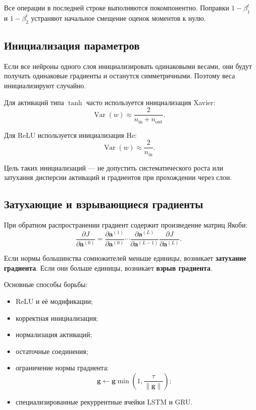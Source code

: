 \documentclass[12pt,a4paper]{article}
\theoremstyle{definition}
\newcommand{\1}{\mathbf{1}}
\begin{document}
Все операции в последней строке выполняются покомпонентно.
Поправки $1-\beta_1^t$ и $1-\beta_2^t$ устраняют начальное смещение
оценок моментов к нулю.

\subsection{Инициализация параметров}

Если все нейроны одного слоя инициализировать одинаковыми весами,
они будут получать одинаковые градиенты и останутся симметричными.
Поэтому веса инициализируют случайно.

Для активаций типа $\tanh$ часто используется инициализация Xavier:
\[
    \operatorname{Var}(w)
    \approx
    \frac{2}{n_{\mathrm{in}}+n_{\mathrm{out}}}.
\]

Для ReLU используется инициализация He:
\[
    \operatorname{Var}(w)
    \approx
    \frac{2}{n_{\mathrm{in}}}.
\]

Цель таких инициализаций --- не допустить систематического роста или
затухания дисперсии активаций и градиентов при прохождении через слои.

\subsection{Затухающие и взрывающиеся градиенты}

При обратном распространении градиент содержит произведение матриц
Якоби:
\[
    \frac{\partial J}{\partial\bm{a}^{(0)}}
    =
    \frac{\partial\bm{a}^{(1)}}{\partial\bm{a}^{(0)}}
    \cdots
    \frac{\partial\bm{a}^{(L)}}{\partial\bm{a}^{(L-1)}}
    \frac{\partial J}{\partial\bm{a}^{(L)}}.
\]

Если нормы большинства сомножителей меньше единицы, возникает
\textbf{затухание градиента}. Если они больше единицы, возникает
\textbf{взрыв градиента}.

Основные способы борьбы:

\begin{itemize}
    \item ReLU и её модификации;
    \item корректная инициализация;
    \item нормализация активаций;
    \item остаточные соединения;
    \item ограничение нормы градиента:
    \[
        \bm{g}
        \gets
        \bm{g}
        \min\left(1,\frac{\tau}{\|\bm{g}\|}\right);
    \]
    \item специализированные рекуррентные ячейки LSTM и GRU.
\end{itemize}
\end{document}
